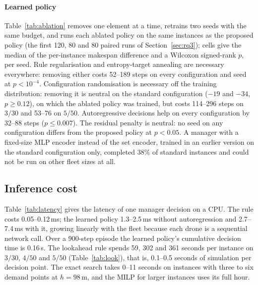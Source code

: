 \documentclass[final,5p,times,twocolumn]{elsarticle}
\begin{document}
\paragraph{Learned policy}
Table~\ref{tab:ablation} removes one element at a time, retrains two seeds with the same budget,
and runs each ablated policy on the same instances as the proposed policy (the first 120, 80 and
80 paired runs of Section~\ref{sec:rq3}); cells give the median of the per-instance makespan
difference and a Wilcoxon signed-rank $p$, per seed. Rule regularisation and entropy-target
annealing are necessary everywhere: removing either costs 52--189 steps on every configuration
and seed at $p<10^{-4}$. Configuration randomisation is necessary off the training distribution:
removing it is neutral on the standard configuration ($-19$ and $-34$, $p \ge 0.12$), on which
the ablated policy was trained, but costs 114--296 steps on $3/30$ and 53--76 on $5/50$.
Autoregressive decisions help on every configuration by 32--88 steps ($p \le 0.007$). The
residual penalty is neutral: no seed on any configuration differs from the proposed policy at
$p<0.05$. A manager with a fixed-size MLP encoder instead of the set encoder, trained in an
earlier version on the standard configuration only, completed 38\% of standard instances and could
not be run on other fleet sizes at all.

\begin{table}[t]
\centering
\caption{Ablation of the learned policy. Each cell gives, for two independently trained seeds,
the median per-instance makespan difference between the ablated policy and the proposed policy on
the same instances (positive: the removed element was needed) and the Wilcoxon signed-rank $p$.}
\label{tab:ablation}
\footnotesize

\end{table}

\subsection{Inference cost}
\label{sec:cost}

Table~\ref{tab:latency} gives the latency of one manager decision on a CPU. The rule costs
0.05--0.12\,ms; the learned policy 1.3--2.5\,ms without autoregression and 2.7--7.4\,ms with it,
growing linearly with the fleet because each drone is a sequential network call. Over a 900-step
episode the learned policy's cumulative decision time is 0.16\,s. The lookahead rule spends 59,
302 and 361 seconds per instance on $3/30$, $4/50$ and $5/50$ (Table~\ref{tab:look}), that is,
0.1--0.5 seconds of simulation per decision point. The exact search takes 0--11 seconds on instances with three to six demand points
at $h = 98$\,m, and the MILP for larger instances uses its full hour.
\end{document}
